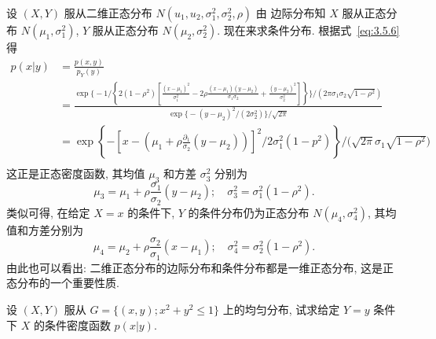 	\begin{example}\label{exam:3.5.4}
		设 $(X,Y)$ 服从二维正态分布 $N(u_1,u_2,\sigma_1^2,\sigma_2^2,\rho)$ 由
		边际分布知 $X$ 服从正态分布 $N(\mu_1,\sigma_1^2)$, $Y$ 服从正态分布 $N(\mu_2,\sigma_2^2)$. 现在来求条件分布.
		根据式~\ref{eq:3.5.6} 得
		\begin{align*}
			 p(x|y)&=\frac{p(x,y)}{p_Y(y)}	\\
			&=\frac{\exp\bigg\{-1/\left\{2(1-\rho^2)\left[
			\frac{(x-\mu_1)^2}{\sigma_1^2}-2\rho\frac{(x-\mu_1)(y-\mu_2)}{\sigma_1\sigma_2}
			+\frac{(y-\mu_2)^2}{\sigma_2^2}\right]\right\}\bigg\}/(2\pi\sigma_1\sigma_2\sqrt{1-\rho^2})}
			{\exp\big\{-(y-\mu_2)^2/(2\sigma_2^2)\big\}/\sqrt{2\pi}}	\\
			&=\exp \left\{-\left[x-\left(\mu_{1}+\rho \frac{\partial_{1}}{\sigma_{2}}\left(y-\mu_{2}\right)\right)\right]^{2}/{2 \sigma_{1}^{2}\left(1-p^{2}\right)}\right\}	/\Big(\sqrt{2 \pi} \sigma_{1} \sqrt{1-\rho^{2}}\Big) \\
		\end{align*}
		这正是正态密度函数, 其均值 $\mu_3$ 和方差 $\sigma_3^2$ 分别为
		\[
		 	\mu_{3}=\mu_{1}+\rho \frac{\sigma_{1}}{\sigma_{2}}\left(y-\mu_{2}\right) ;
		 	 \quad \sigma_{3}^{2}=\sigma_{1}^{2}\left(1-\rho^{2}\right).
		\]
		类似可得, 在给定 $X=x$ 的条件下, $Y$ 的条件分布仍为正态分布 $N(\mu_4,\sigma_4^2)$, 其均值和方差分别为
		\[
			\mu_{4}=\mu_{2}+\rho \frac{\sigma_{2}}{\sigma_{1}}\left(x-\mu_{1}\right) ;
			 \quad \sigma_{4}^{2}=\sigma_{2}^{2}\left(1-\rho^{2}\right).
		\]
		由此也可以看出: 二维正态分布的边际分布和条件分布都是一维正态分布, 这是正态分布的一个重要性质.
	\end{example}
	\begin{example}\label{exam:3.5.5}
		设 $(X,Y)$ 服从 $G=\{(x,y);x^2+y^2\leq 1\}$ 上的均匀分布, 试求给定 $Y=y$ 条件下 $X$ 的条件密度函数 $p(x|y)$.
	\end{example}
